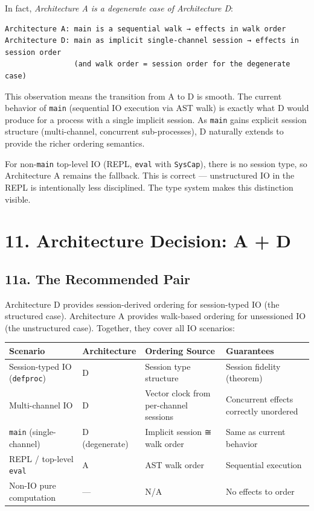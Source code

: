 \documentclass[11pt]{article}
\begin{document}
In fact, \emph{Architecture A is a degenerate case of Architecture D}:

\begin{verbatim}
Architecture A: main is a sequential walk → effects in walk order
Architecture D: main as implicit single-channel session → effects in session order
                (and walk order = session order for the degenerate case)
\end{verbatim}

This observation means the transition from A to D is smooth. The current
behavior of \texttt{main} (sequential IO execution via AST walk) is exactly what D
would produce for a process with a single implicit session. As \texttt{main} gains
explicit session structure (multi-channel, concurrent sub-processes), D
naturally extends to provide the richer ordering semantics.

For non-\texttt{main} top-level IO (REPL, \texttt{eval} with \texttt{SysCap}), there is no session
type, so Architecture A remains the fallback. This is correct — unstructured
IO in the REPL is intentionally less disciplined. The type system makes this
distinction visible.
\section{11. Architecture Decision: A + D}
\label{sec:org8ba83f6}

\subsection{11a. The Recommended Pair}
\label{sec:orgf4a6593}

Architecture D provides session-derived ordering for session-typed IO (the
structured case). Architecture A provides walk-based ordering for unsessioned
IO (the unstructured case). Together, they cover all IO scenarios:

\begin{center}
\begin{tabular}{llll}
Scenario & Architecture & Ordering Source & Guarantees\\
\hline
Session-typed IO (\texttt{defproc}) & D & Session type structure & Session fidelity (theorem)\\
Multi-channel IO & D & Vector clock from per-channel sessions & Concurrent effects correctly unordered\\
\texttt{main} (single-channel) & D (degenerate) & Implicit session ≅ walk order & Same as current behavior\\
REPL / top-level \texttt{eval} & A & AST walk order & Sequential execution\\
Non-IO pure computation & — & N/A & No effects to order\\
\end{tabular}
\end{center}
\end{document}
